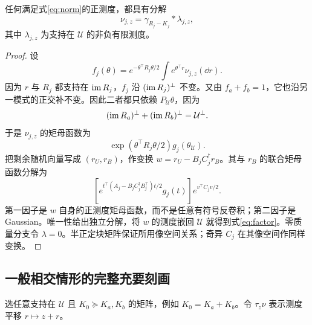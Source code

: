 \documentclass[UTF8,fontset=fandol,11pt,a4paper]{ctexart}
\theoremstyle{definition}\newtheorem{definition}[theorem]{定义}\newtheorem{assumption}[theorem]{条件}
\numberwithin{equation}{section}
\begin{document}
\begin{lemma}
\label{lem:factor}
任何满足式\eqref{eq:norm}的正测度，都具有分解
\begin{equation}
\boxed{\nu_{j,z}=\gamma_{R_j-K_j}*\lambda_{j,z},}
\label{eq:factor}
\end{equation}
其中 $\lambda_{j,z}$ 为支持在 $\mathcal U$ 的非负有限测度。
\end{lemma}
\begin{proof}
设
\[
f_j(\theta)=e^{-\theta^\top R_j\theta/2}
\int e^{\theta^\top r}\nu_{j,z}(\dd r).
\]
因为 $r$ 与 $R_j$ 都支持在 $\operatorname{im} R_j$，$f_j$ 沿 $(\operatorname{im} R_j)^\perp$ 不变。又由 $f_a+f_b=1$，它也沿另一模式的正交补不变。因此二者都只依赖 $P_{\mathcal U}\theta$，因为
\[
(\operatorname{im} R_a)^\perp+(\operatorname{im} R_b)^\perp=\mathcal U^\perp.
\]
于是 $\nu_{j,z}$ 的矩母函数为
\[
\exp(\theta^\top R_j\theta/2)g_j(\theta_{\mathcal U}).
\]
把剩余随机向量写成 $(r_U,r_B)$，作变换
$w=r_U-B_jC_j^\dagger r_B$。其与 $r_B$ 的联合矩母函数分解为
\[
\left[e^{t^\top(A_j-B_jC_j^\dagger B_j^\top)t/2}g_j(t)\right]
 e^{v^\top C_jv/2}.
\]
第一因子是 $w$ 自身的正测度矩母函数，而不是任意有符号反卷积；第二因子是 Gaussian。唯一性给出独立分解，将 $w$ 的测度嵌回 $\mathcal U$ 就得到式\eqref{eq:factor}。零质量分支令 $\lambda=0$。半正定块矩阵保证所用像空间关系；奇异 $C_j$ 在其像空间作同样变换。
\end{proof}

\subsection{一般相交情形的完整充要刻画}
选任意支持在 $\mathcal U$ 且 $K_0\succeq K_a,K_b$ 的矩阵，例如 $K_0=K_a+K_b$。令 $\tau_z\nu$ 表示测度平移 $r\mapsto z+r$。
\end{document}
